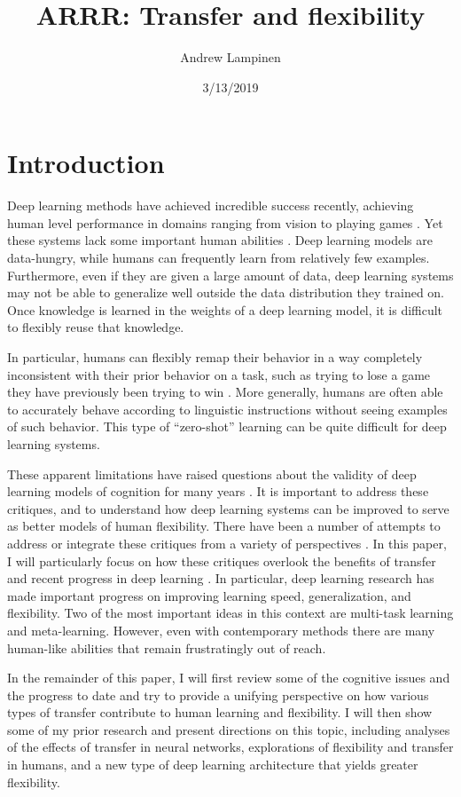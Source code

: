 \documentclass[11pt]{article}
\begin{document}
 
\title{ARRR: Transfer and flexibility}
\author{Andrew Lampinen}
\date{3/13/2019}
\maketitle

\newpage
\tableofcontents

\newpage
\section{Introduction}
Deep learning methods have achieved incredible success recently, achieving human level performance in domains ranging from vision \citep[e.g.]{Szegedy2015} to playing games \citep[e.g.]{Silver2016}. Yet these systems lack some important human abilities \citep[e.g.]{Lake2016}. Deep learning models are data-hungry, while humans can frequently learn from relatively few examples. Furthermore, even if they are given a large amount of data, deep learning systems may not be able to generalize well outside the data distribution they trained on. Once knowledge is learned in the weights of a deep learning model, it is difficult to flexibly reuse that knowledge. \par
In particular, humans can flexibly remap their behavior in a way completely inconsistent with their prior behavior on a task, such as trying to lose a game they have previously been trying to win \citep{Lake2016}. More generally, humans are often able to accurately behave according to linguistic instructions without seeing examples of such behavior. This type of ``zero-shot'' learning can be quite difficult for deep learning systems. \par 
These apparent limitations have raised questions about the validity of deep learning models of cognition for many years \citep[e.g.]{Fodor1988, Lake2015, Lake2016, Lake2017, Marcus2018}. It is important to address these critiques, and to understand how deep learning systems can be improved to serve as better models of human flexibility. There have been a number of attempts to address or integrate these critiques from a variety of perspectives \citep[e.g.]{McClelland1999, McClelland2010}. In this paper, I will particularly focus on how these critiques overlook the benefits of transfer \citep{Lampinen2017a} and recent progress in deep learning \citep{Hansen2017}. In particular, deep learning research has made important progress on improving learning speed, generalization, and flexibility. Two of the most important ideas in this context are multi-task learning and meta-learning. However, even with contemporary methods there are many human-like abilities that remain frustratingly out of reach. \par
In the remainder of this paper, I will first review some of the cognitive issues and the progress to date and try to provide a unifying perspective on how various types of transfer contribute to human learning and flexibility. I will then show some of my prior research and present directions on this topic, including analyses of the effects of transfer in neural networks, explorations of flexibility and transfer in humans, and a new type of deep learning architecture that yields greater flexibility. \par
\end{document}
